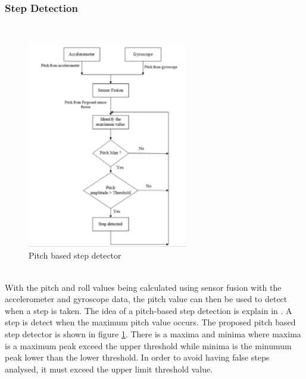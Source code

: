\documentclass{l4proj}
\begin{document}
\subsubsection{Step Detection}~\\
\begin{figure}[h]
    \centering
    \includegraphics[width=70mm]{images/pitch}
    \caption{Pitch based step detector}
    \label{fig:pitch1}
\end{figure}\\
With the pitch and roll values being calculated using sensor fusion with the accelerometer and gyroscope data, the pitch value can then be used to detect when a step is taken. The idea of a pitch-based step detection is explain in \cite{pitchbased}. A step is detect when the maximum pitch value occurs. The proposed pitch based step detector is shown in figure \ref{fig:pitch1}. There is a maxima and minima where maxima is a maximum peak exceed the upper threshold while minima is the minumum peak lower than the lower threshold. In order to avoid having false steps analysed, it must exceed the upper limit threshold value.
\end{document}
